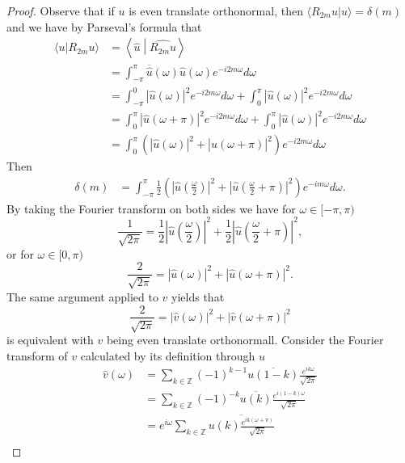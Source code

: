 \documentclass{report}
\newcommand{\Z}{\mathbb{Z}}
\begin{document}
\begin{proof}
Observe that if $u$ is even translate orthonormal, then $\langle R_{2m}u |  u \rangle = \delta(m)$ and we have by Parseval's formula that
\begin{align*}
\langle u |  R_{2m}u \rangle &= \left \langle \hat u \middle |  \widehat{R_{2m}u}  \right \rangle\\
&= \int_{-\pi}^{\pi}\overline {\hat u}(\omega) \hat u(\omega) e^{-i2m\omega} d\omega\\
&= \int_{-\pi}^{0} |\hat u(\omega)|^2 e^{-i2m\omega} d\omega+\int_{0}^{\pi} |\hat u(\omega)|^2 e^{-i2m\omega} d\omega\\
&= \int_{0}^{\pi} |\hat u(\omega+\pi)|^2 e^{-i2m\omega} d\omega+\int_{0}^{\pi} |\hat u(\omega)|^2 e^{-i2m\omega} d\omega\\
&= \int_{0}^{\pi}  \left(|\hat u(\omega)|^2+|\hat u(\omega+\pi)|^2 \right) e^{-i2m\omega} d\omega
\end{align*}
Then
\begin{align*}
\delta(m)&= \int_{-\pi}^{\pi}  \frac{1}{2}\left(\left|\hat u\left(\frac{\omega}{2}\right)\right|^2+\left|\hat u\left(\frac{\omega}{2}+\pi\right)\right|^2 \right) e^{-im\omega} d\omega.
 \end{align*}
 By taking the Fourier transform on both sides we have for $\omega \in [-\pi,\pi)$
 $$
\frac 1 {\sqrt{2\pi}}=\frac{1}{2}\left|\hat u\left(\frac{\omega}{2}\right)\right|^2+\frac{1}{2}\left|\hat u\left(\frac{\omega}{2}+\pi\right)\right|^2,
 $$
or for $\omega \in [0,\pi)$
\begin{equation}
\label{eq:a}
\frac 2 {\sqrt{2\pi}}=\left|\hat u\left(\omega \right)\right|^2+\left|\hat u\left(\omega+\pi \right)\right|^2.
\end{equation}
The same argument applied to $v$ yields that
\begin{equation}
\label{eq:b}
\frac 2  {\sqrt{2\pi}}=\left|\hat v\left(\omega \right)\right|^2+\left|\hat v\left(\omega+\pi \right)\right|^2
\end{equation}
is equivalent with $v$ being even translate orthonormall.
Consider the Fourier transform of $v$ calculated by its definition through $u$
\begin{align*}
\hat v (\omega) &= \sum_{k\in \Z} (-1)^{k-1}\overline{u(1-k)} \frac{e^{ik\omega}}{\sqrt{2\pi}}\\
 &= \sum_{k\in \Z} (-1)^{-k}\overline{u(k)}\frac{e^{i(1-k)\omega}}{\sqrt{2\pi}}\\
 &= e^{i\omega}\sum_{k\in \Z}\overline{u(k)\frac{e^{ik(\omega+\pi)}}{\sqrt{2\pi}}}\\

\end{align*}
\end{proof}
\end{document}
